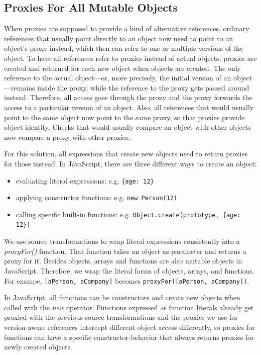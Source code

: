 \subsection{Proxies For All Mutable Objects}


When proxies are supposed to provide a kind of alternative references, ordinary references that usually point directly to an object now need to point to an object's proxy instead, which then can refer to one or multiple versions of the object.
To have all references refer to proxies instead of actual objects, proxies are created and returned for each new object when objects are created.
The only reference to the actual object---or, more precisely, the initial version of an object---remains inside the proxy, while the reference to the proxy gets passed around instead.
Therefore, all access goes through the proxy and the proxy forwards the access to a particular version of an object.
Also, all references that would usually point to the same object now point to the same proxy, so that proxies provide object identity.
Checks that would usually compare an object with other objects now compare a proxy with other proxies.

For this solution, all expressions that create new objects need to return proxies for those instead.
In JavaScript, there are three different ways to create an object: 
\begin{itemize}
    \item evaluating literal expressions: e.g. \lstinline|{age: 12}|
    \item applying constructor functions: e.g. \lstinline|new Person(12)|
    \item calling specific built-in functions: e.g. \lstinline|Object.create(prototype, {age: 12})|
\end{itemize}

We use source transformations to wrap literal expressions consistently into a \emph{proxyFor()} function.
That function takes an object as parameter and returns a proxy for it.
Besides objects, arrays and functions are also mutable objects in JavaScript.
Therefore, we wrap the literal forms of objects, arrays, and functions.
For exampe, \lstinline{[aPerson, aCompany]} becomes \lstinline{proxyFor([aPerson, aCompany])}.

In JavaScript, all functions can be constructors and create new objects when called with the \emph{new} operator.
Functions expressed as function literals already get proxied with the previous source transformations and the proxies we use for version-aware references intercept different object access differently, so proxies for functions can have a specific constructor-behavior that always returns proxies for newly created objects.

